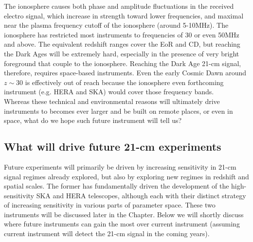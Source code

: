  The ionosphere causes both phase and amplitude fluctuations in the received electro signal, which increase in strength toward lower frequencies, and maximal near the plasma frequency cutoff of the ionosphere (around 5-10MHz). The ionosphere has restricted most instruments to frequencies of 30 or even 50MHz and above. The equivalent redshift ranges cover the EoR and CD, but reaching the Dark Ages will be extremely hard, especially in the presence of very bright foreground that couple to the ionosphere. Reaching the Dark Age 21-cm signal, therefore, requires space-based instruments. Even the early Cosmic Dawn around $z\sim 30$ is effectively out of reach because the ionosphere even forthcoming instrument (e.g. HERA and SKA) would cover those frequency bands.\\

\noindent Whereas these technical and environmental reasons will ultimately drive instruments to becomes ever larger and be built on remote places, or even in space, what do we hope such future instrument will tell us?

\subsection{What will drive future 21-cm experiments}

Future experiments will primarily be driven by increasing sensitivity in 21-cm signal regimes already explored, but also by exploring new regimes in redshift and spatial scales. The former has fundamentally driven the development of the high-sensitivity SKA and HERA telescopes, although each with their distinct strategy of increasing sensitivity in various parts of parameter space. These two instruments will be discussed later in the Chapter. Below we will shortly discuss where future instruments can gain the most over current instrument (assuming current instrument will detect the 21-cm signal in the coming years). 

